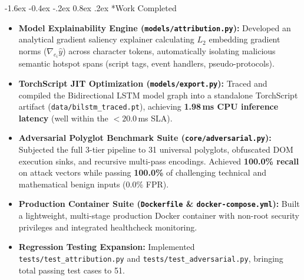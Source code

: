 \documentclass[11pt,a4paper]{article}
\makeatletter
\renewcommand{\section}{\@startsection{section}{1}{\z@}%
  {-1.6ex \@plus -0.4ex \@minus -.2ex}%
  {0.8ex \@plus .2ex}%
  {\normalfont\large\bfseries\color{primaryblue}}}
\makeatother
\begin{document}
\section*{Work Completed}
\begin{itemize}[leftmargin=1.5em, itemsep=1.5pt]
    \item \textbf{Model Explainability Engine (\texttt{models/attribution.py}):} Developed an analytical gradient saliency explainer calculating $L_2$ embedding gradient norms ($\nabla_{e_i} \hat{y}$) across character tokens, automatically isolating malicious semantic hotspot spans (script tags, event handlers, pseudo-protocols).
    \item \textbf{TorchScript JIT Optimization (\texttt{models/export.py}):} Traced and compiled the Bidirectional LSTM model graph into a standalone TorchScript artifact (\texttt{data/bilstm\_traced.pt}), achieving \textbf{1.98\,ms CPU inference latency} (well within the $< 20.0$\,ms SLA).
    \item \textbf{Adversarial Polyglot Benchmark Suite (\texttt{core/adversarial.py}):} Subjected the full 3-tier pipeline to 31 universal polyglots, obfuscated DOM execution sinks, and recursive multi-pass encodings. Achieved \textbf{100.0\% recall} on attack vectors while passing \textbf{100.0\%} of challenging technical and mathematical benign inputs ($0.0\%$ FPR).
    \item \textbf{Production Container Suite (\texttt{Dockerfile} \& \texttt{docker-compose.yml}):} Built a lightweight, multi-stage production Docker container with non-root security privileges and integrated healthcheck monitoring.
    \item \textbf{Regression Testing Expansion:} Implemented \texttt{tests/test\_attribution.py} and \texttt{tests/test\_adversarial.py}, bringing total passing test cases to 51.
\end{itemize}
\end{document}
